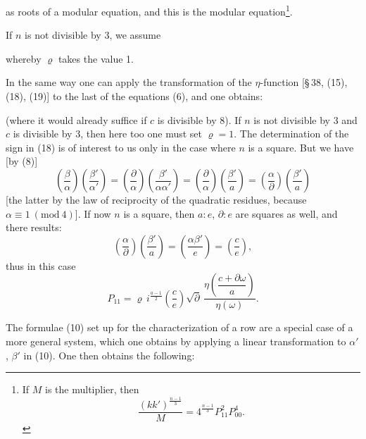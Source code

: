 
as roots of a modular equation, and this is the  modular
equation\footnote{If $M$ is the  multiplier, then
\[
\frac{(kk')^{\frac{n-1}{3}}}{M} = 4^{\frac{n-1}{3}} P_{11}^2 P_{00}^4.
\]}.

If $n$ is not divisible by 3, we assume


whereby $\varrho$ takes the value 1.

In the same way one can apply the transformation of the $\eta$-function
[§\,38, (15), (18), (19)] to the last of the equations (6), and one
obtains:


(where it would already suffice if $c$ is divisible by 8). If $n$ is not
divisible by 3 and $c$ is divisible by 3, then here too one must set
$\varrho=1$. The determination of the sign in (18) is of interest to us
only in the case where $n$ is a square. But we have [by (8)]
\[
\left(\frac{\beta}{\alpha}\right)\left(\frac{\beta'}{\alpha'}\right) = \left(\frac{\partial}{\alpha}\right)\left(\frac{\beta'}{\alpha\alpha'}\right) = \left(\frac{\partial}{\alpha}\right)\left(\frac{\beta'}{a}\right) = \left(\frac{\alpha}{\partial}\right)\left(\frac{\beta'}{a}\right)
\]
[the latter by the law of reciprocity of the quadratic residues, because
$\alpha \equiv 1\ (\mathrm{mod}\ 4)$]. If now $n$ is a square, then
$a\!:\!e$, $\partial\!:\!e$ are squares as well, and there results:
\[
\left(\frac{\alpha}{\partial}\right)\left(\frac{\beta'}{a}\right) = \left(\frac{\alpha\beta'}{e}\right) = \left(\frac{c}{e}\right),
\]
thus in this case
\[
P_{11} = \varrho\, i^{\frac{a-1}{2}}\left(\frac{c}{e}\right)\sqrt{\partial}\,\frac{\eta\left(\dfrac{c+\partial\omega}{a}\right)}{\eta(\omega)}.
\]

The formulae (10) set up for the characterization of a row are a
special case of a more general system, which one obtains by applying a
linear transformation to $\alpha'$, $\beta'$ in (10). One then obtains the
following:
